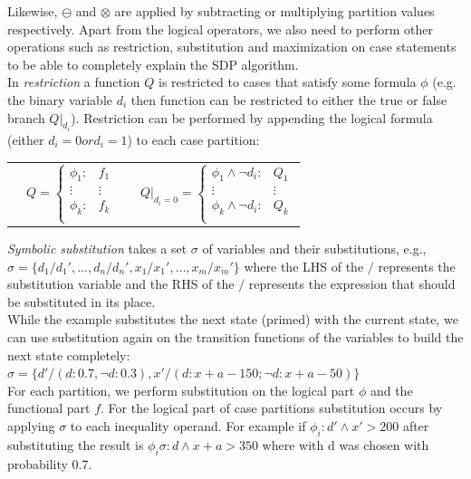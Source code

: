 \documentclass[letterpaper]{article}
\renewcommand{\-}{\text{-}}
\begin{document}
Likewise, $\ominus$ and $\otimes$ are applied by subtracting or multiplying partition values respectively.  
Apart from the logical operators, we also need to perform other operations such as restriction, substitution and maximization on case statements to be able to completely explain the SDP algorithm. \\

In \emph{restriction} a function $Q$ is restricted to cases that satisfy some formula $\phi$ (e.g. the binary variable $d_i$ then function can be restricted to either the true or false branch $Q|_{d_i}$).  
Restriction can be performed by appending  the logical formula (either $d_i=0 or d_i=1$) to each case partition:
{\footnotesize
\begin{center}
\begin{tabular}{r c c l}
&
\hspace{-6mm} 
  $Q = \begin{cases}
    \phi_1: & f_1 \\ 
   \vdots&\vdots\\ 
    \phi_k: & f_k \\ 
  \end{cases}$
&

&
\hspace{-2mm}
  $Q|_{d_i = 0} = \begin{cases}
    \phi_1 \land \neg d_i : & Q_1 \\ 
   \vdots&\vdots \\ 
    \phi_k \land \neg d_i : & Q_k \\ 
  \end{cases}$
\end{tabular}
\end{center}
}
\emph{Symbolic substitution} takes a set $\sigma$ of variables and their substitutions, e.g., 
$\sigma = \{ d_1 / d_1', \ldots, d_n / d_n', x_1 / x_1', \ldots, x_m / x_m' \}$ where
the LHS of the $/$ represents the substitution variable and the RHS of the $/$ represents 
the expression that should be substituted in its place.\\
While the example substitutes the next state (primed) with the current state, we can use substitution again on the transition functions of the variables to build the next state completely:
 $\sigma = \{ d'/(d:0.7,\neg d:0.3), x'/(d: x + a - 150; \neg d: x + a - 50) \}$
\\For each partition, we perform substitution on the logical part $\phi$ and the functional part $f$. For the logical part of case partitions substitution occurs by applying $\sigma$ to each inequality operand. For example if $\phi_i: d' \wedge x'>200$ after substituting the result is $\phi_i\sigma : d \wedge x + a > 350 $ where with d was chosen with probability 0.7. 
\end{document}

